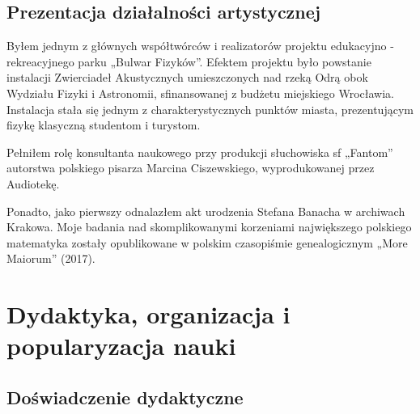\documentclass[12pt,a4paper]{article}
\begin{document}
\subsection*{Prezentacja działalności artystycznej}

\indent\indent Byłem jednym z głównych współtwórców  i realizatorów projektu edukacyjno - rekreacyjnego parku „Bulwar Fizyków”. Efektem projektu było powstanie instalacji Zwierciadeł Akustycznych umieszczonych nad rzeką Odrą obok Wydziału Fizyki i Astronomii, sfinansowanej z budżetu miejskiego Wrocławia. Instalacja stała się jednym z charakterystycznych punktów miasta, prezentującym fizykę klasyczną studentom i turystom.

Pełniłem rolę konsultanta naukowego przy produkcji słuchowiska sf „Fantom” autorstwa polskiego pisarza Marcina Ciszewskiego, wyprodukowanej przez Audiotekę.

Ponadto, jako pierwszy odnalazłem akt urodzenia Stefana Banacha w archiwach Krakowa. Moje badania nad skomplikowanymi korzeniami największego polskiego matematyka zostały opublikowane w polskim czasopiśmie genealogicznym „More Maiorum” (2017).

\section{Dydaktyka, organizacja i popularyzacja nauki}

\subsection{Doświadczenie dydaktyczne}
\end{document}
